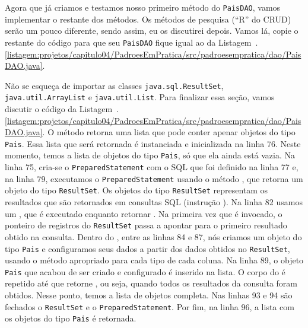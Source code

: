 Agora que já criamos e testamos nosso primeiro método do \texttt{PaisDAO}, vamos implementar o restante dos métodos. Os métodos de pesquisa (``R'' do CRUD) serão um pouco diferente, sendo assim, eu os discutirei depois. Vamos lá, copie o restante do código para que seu \texttt{PaisDAO} fique igual ao da Listagem~\thechapter.\ref{listagem:projetos/capitulo04/PadroesEmPratica/src/padroesempratica/dao/PaisDAO.java}.


Não se esqueça de importar as classes \texttt{java.sql.ResultSet}, \texttt{java.util.ArrayList} e \texttt{java.util.List}. Para finalizar essa seção, vamos discutir o código da Listagem~\thechapter.\ref{listagem:projetos/capitulo04/PadroesEmPratica/src/padroesempratica/dao/PaisDAO.java}. O método  retorna uma lista que pode conter apenar objetos do tipo \texttt{Pais}. Essa lista que será retornada é instanciada e inicializada na linha 76. Neste momento, temos a lista de objetos do tipo \texttt{Pais}, só que ela ainda está vazia. Na linha 75, cria-se o \texttt{PreparedStatement} com o SQL que foi definido na linha 77 e, na linha 79, executamos o \texttt{PreparedStatement} usando o método , que retorna um objeto do tipo \texttt{ResultSet}. Os objetos do tipo \texttt{ResultSet} representam os resultados que são retornados em consultas SQL (instrução ). Na linha 82 usamos um , que é executado enquanto  retornar . Na primeira vez que  é invocado, o ponteiro de registros do \texttt{ResultSet} passa a apontar para o primeiro resultado obtido na consulta. Dentro do , entre as linhas 84 e 87, nós criamos um objeto do tipo \texttt{Pais} e configuramos seus dados a partir dos dados obtidos no \texttt{ResultSet}, usando o método apropriado para cada tipo de cada coluna. Na linha 89, o objeto \texttt{Pais} que acabou de ser criado e configurado é inserido na lista. O corpo do  é repetido até que  retorne , ou seja, quando todos os resultados da consulta foram obtidos. Nesse ponto, temos a lista de objetos completa. Nas linhas 93 e 94 são fechados o \texttt{ResultSet} e o \texttt{PreparedStatement}. Por fim, na linha 96, a lista com os objetos do tipo \texttt{Pais} é retornada.

